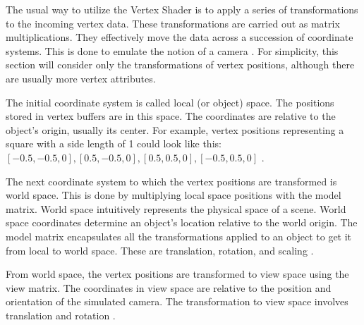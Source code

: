 \documentclass[
  digital,     %
  oneside,     %
  nosansbold,  %
  nocolorbold, %
  lof,         %
  lot,         %
]{fithesis4}
\begin{document}
The usual way to utilize the Vertex Shader is to apply a series of transformations to the incoming vertex data.
These transformations are carried out as matrix multiplications.
They effectively move the data across a succession of coordinate systems. This is done to emulate the notion of a camera
\cite[p.125-126]{opengl-book}. For simplicity, this section will consider only the transformations of vertex positions,
although there are usually more vertex attributes.

The initial coordinate system is called local (or object) space.
The positions stored in vertex buffers are in this space.
The coordinates are relative to the object's origin, usually its center. For example, vertex positions
representing a square with a side length of 1 could look like this: $[-0.5,-0.5,0], [0.5,-0.5,0], [0.5,0.5,0], [-0.5,0.5,0]$
\cite{learnopengl-coord-systems}.

The next coordinate system to which the vertex positions are transformed is world space.
This is done by multiplying local space positions with the model matrix.
World space intuitively represents the physical space of a scene. World space coordinates
determine an object's location relative to the world origin.
The model matrix encapsulates all the transformations applied to an object to get it from local
to world space. These are translation, rotation, and scaling \cite{learnopengl-coord-systems}.

From world space, the vertex positions are transformed to view space using the view matrix.
The coordinates in view space are relative to the position and orientation of the
simulated camera. The transformation to view space involves translation and rotation \cite{learnopengl-coord-systems}.
\end{document}
